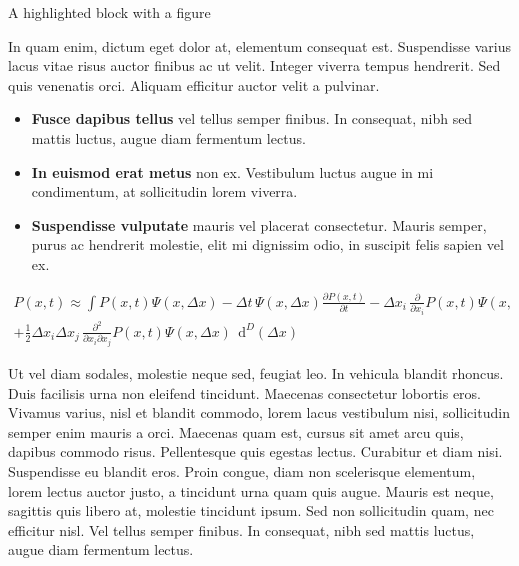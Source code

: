 \documentclass[final]{beamer}
\newlength{\colwidth}
\begin{document}
\begin{frame}[t]
\begin{columns}[t]
\begin{column}{\colwidth}
\begin{alertblock}{A highlighted block with a figure}
\begin{table}
    \end{table}
        In quam enim, dictum eget dolor at, elementum consequat est. Suspendisse varius lacus vitae risus auctor finibus ac ut velit. Integer viverra tempus hendrerit. Sed quis venenatis orci. Aliquam efficitur auctor velit a pulvinar. 

    \begin{itemize}
      \item \textbf{Fusce dapibus tellus} vel tellus semper finibus. In
        consequat, nibh sed mattis luctus, augue diam fermentum lectus.
      \item \textbf{In euismod erat metus} non ex. Vestibulum luctus augue in
        mi condimentum, at sollicitudin lorem viverra.
      \item \textbf{Suspendisse vulputate} mauris vel placerat consectetur.
        Mauris semper, purus ac hendrerit molestie, elit mi dignissim odio, in
        suscipit felis sapien vel ex.
    \end{itemize}
    
    
\begin{align*}
P(x,t) \approx
\int  P(x,t) \Psi\left(x, \Delta x \right)  - \Delta t \, \Psi\left(x, \Delta x \right) \frac{ \partial P(x,t) }{ \partial t}  - \Delta x_{i} \, \frac{\partial }{\partial x_{i}}  P(x,t) \Psi\left(x, \Delta x \right)   \\
 + \frac{1}{2} \Delta x_{i} \Delta x_{j} \, \frac{\partial^2}{\partial x_{i} \partial x_{j} }  P(x,t) \Psi\left(x, \Delta x \right) \; \, \mathrm d^D \! \left( \Delta x \right)
\end{align*}

Ut vel diam sodales, molestie neque sed, feugiat leo. In vehicula blandit rhoncus. Duis facilisis urna non eleifend tincidunt. Maecenas consectetur lobortis eros. Vivamus varius, nisl et blandit commodo, lorem lacus vestibulum nisi, sollicitudin semper enim mauris a orci. Maecenas quam est, cursus sit amet arcu quis, dapibus commodo risus. Pellentesque quis egestas lectus. Curabitur et diam nisi. Suspendisse eu blandit eros. Proin congue, diam non scelerisque elementum, lorem lectus auctor justo, a tincidunt urna quam quis augue. Mauris est neque, sagittis quis libero at, molestie tincidunt ipsum. Sed non sollicitudin quam, nec efficitur nisl. Vel tellus semper finibus. In
        consequat, nibh sed mattis luctus, augue diam fermentum lectus.
  \end{alertblock}
          
    \vspace{0pt}
    \end{column}


\end{columns}
\end{frame}
\end{document}
